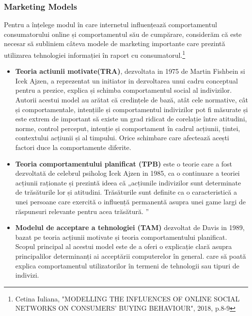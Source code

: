 \documentclass[a4paper, 12pt]{article}
\begin{document}
			\subsubsection{Marketing Models}		
			\quad Pentru a înțelege modul în care internetul influențează comportamentul consumatorului online și comportamentul său de cumpărare, considerăm că este necesar să subliniem câteva modele de marketing importante care prezintă utilizarea tehnologiei informației în raport cu consumatorul.\footnote{Cetina Iuliana, "MODELLING THE INFLUENCES OF ONLINE SOCIAL NETWORKS ON CONSUMERS’ BUYING BEHAVIOUR", 2018, p.8-9}
			\begin{itemize}
				\item \textbf{Teoria actiunii motivate(TRA)}, dezvoltata in 1975 de Martin Fishbein si Icek Ajzen, a reprezentat un initiator in dezvoltarea unui cadru conceptual pentru a prezice, explica și schimba comportamentul social al indivizilor. Autorii acestui model au arătat că credințele de bază, atât cele normative, cât și comportamentale, intențiile și comportamentul indivizilor pot fi măsurate și este extrem de important să existe un grad ridicat de corelație între atitudini, norme, control perceput, intenție și comportament în cadrul acțiunii, țintei, contextului acțiunii și al timpului. Orice schimbare care afectează acești factori duce la comportamente diferite.
				\item \textbf{Teoria comportamentului planificat (TPB)} este o teorie care a fost dezvoltată de celebrul psiholog Icek Ajzen in 1985, ca o continuare a teoriei acțiunii raționate și prezintă ideea că „acțiunile indivizilor sunt determinate de trăsăturile lor și atitudini. Trăsăturile sunt definite ca o caracteristică a unei persoane care exercită o influență permanentă asupra unei game largi de răspunsuri relevante pentru acea trăsătură. ”
				\item \textbf{Modelul de acceptare a tehnologiei (TAM)} dezvoltat de Davis in 1989, bazat pe teoria acțiunii motivate și teoria comportamentului planificat. Scopul principal al acestui model este de a oferi o explicație clară asupra principalilor determinanți ai acceptării computerelor în general. care să poată explica comportamentul utilizatorilor în termeni de tehnologii sau tipuri de indivizi.
			\end{itemize}
\end{document}
